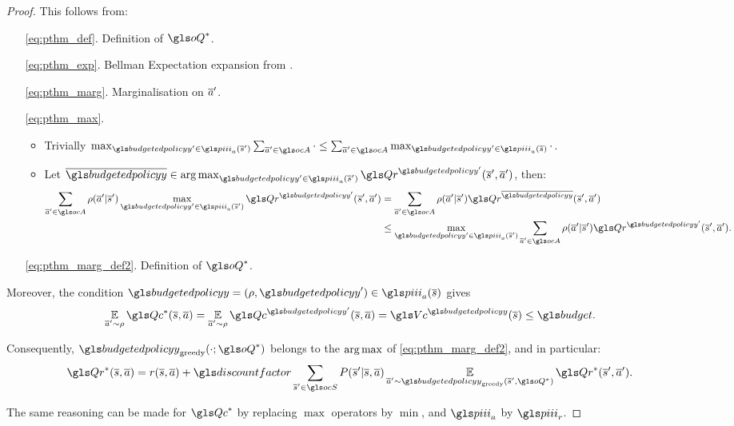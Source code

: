 \begin{proof}
    This follows from:
    \begin{enumerate}
        \item[\eqref{eq:pthm_def}.] Definition of $\oQ^*$.
        \item[\eqref{eq:pthm_exp}.] Bellman Expectation expansion from .
        \item[\eqref{eq:pthm_marg}.] Marginalisation on $\overline{a}'$.
        \item[\eqref{eq:pthm_max}.] \begin{itemize}
                                        \item Trivially $\max_{\budgetedpolicy'\in\policies_a(\os')} \sum_{\oa'\in\ocA} \cdot \leq \sum_{\oa'\in\ocA} \max_{ \budgetedpolicy'\in\policies_a(\os)} \cdot$.
                                        \item Let $\ov{\budgetedpolicy}\in\argmax_{\budgetedpolicy'\in\policies_a(\os')} \Qr^{\budgetedpolicy'}(\os', \oa')$, then:
                                        \begin{align*}
                                            \sum_{\oa'\in\ocA}\rho(\oa'|\os')\max_{\budgetedpolicy'\in\policies_a(\os')}\Qr^{\budgetedpolicy'}(\os', \oa') &= \sum_{\oa'\in\ocA}\rho(\oa'|\os')\Qr^{\ov{\budgetedpolicy}}(\os', \oa') \\
                                            &\leq  \max_{\budgetedpolicy'\in\policies_a(\os')} \sum_{\oa'\in\ocA}\rho(\oa'|\os')\Qr^{\budgetedpolicy'}(\os', \oa').
                                        \end{align*}
        \end{itemize}
        \item[\eqref{eq:pthm_marg_def2}.] Definition of $\oQ^*$.
    \end{enumerate}

    Moreover, the condition $\budgetedpolicy=(\rho, \budgetedpolicy')\in\policies_a(\os)$ gives
    \begin{equation*}
        \expectedvalueover{\oa'\sim\rho} \Qc^{*}(\os, \oa) = \expectedvalueover{\oa'\sim\rho} \Qc^{\budgetedpolicy'}(\os, \oa) = \Vc^{\budgetedpolicy}(\os) \leq \budget.
    \end{equation*}

    Consequently, $\budgetedpolicy_\text{greedy}(\cdot; \oQ^*)$ belongs to the $\operatorname*{arg\,max}$ of \eqref{eq:pthm_marg_def2}, and in particular:
    \begin{equation*}
        \Qr^*(\os, \oa) = r(\os, \oa) + \discountfactor \sum_{\os'\in\ocS}  P(\os' | \os, \oa) \expectedvalueover{\oa'\sim\budgetedpolicy_\text{greedy}(\os', \oQ^*)} \Qr^*(\os', \oa').
    \end{equation*}

    The same reasoning can be made for $\Qc^*$ by replacing $\max$ operators by $\min$, and $\policies_a$ by $\policies_r$.

\end{proof}


